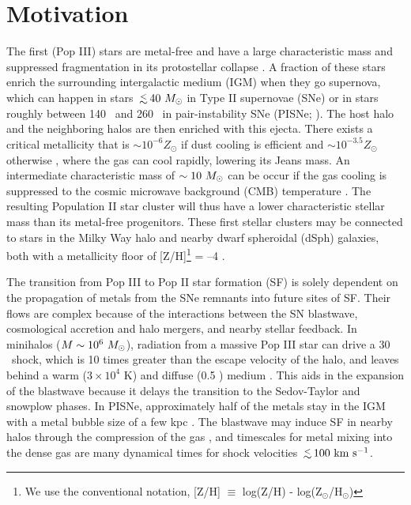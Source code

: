 \documentclass[12pt]{article}
\newcommand{\cubecm}{\ifmmode{{\rm cm^{-3}}}\else{cm$^{-3}$}\fi}
\newcommand{\lsim}{\lower0.3em\hbox{$\,\buildrel <\over\sim\,$}}
\newcommand{\kms}{\ifmmode{{\rm km~s^{-1}}}\else{km s$^{-1}$}\fi}
\newcommand{\Ms}{\ifmmode{M_\odot}\else{$M_\odot$}\fi}
\begin{document}
\section*{Motivation}

The first (Pop III) stars are metal-free and have a large
characteristic mass and suppressed fragmentation in its protostellar
collapse \cite{ABN02, Bromm02_P3, Yoshida03, OShea07a}.  A fraction of
these stars enrich the surrounding intergalactic medium (IGM) when
they go supernova, which can happen in stars $\lsim 40~\Ms$ in Type II
supernovae (SNe) or in stars roughly between 140 \Ms~and 260 \Ms~in
pair-instability SNe (PISNe; \cite{2002ApJ...567..532H}).  The host
halo and the neighboring halos are then enriched with this ejecta.
There exists a critical metallicity that is $\sim 10^{-6} Z_\odot$ if
dust cooling is efficient \cite{Omukai05, Schneider06_Frag, clark08}
and $\sim 10^{-3.5} Z_\odot$ otherwise \cite{Bromm01,
  2009ApJ...691..441S}, where the gas can cool rapidly, lowering its
Jeans mass.  An intermediate characteristic mass of $\sim10~\Ms$ can
be occur if the gas cooling is suppressed to the cosmic microwave
background (CMB) temperature \cite{Larson98, Tumlinson07_IMF,
  2009ApJ...691..441S}.  The resulting Population II star cluster will
thus have a lower characteristic stellar mass than its metal-free
progenitors.  These first stellar clusters may be connected to stars
in the Milky Way halo and nearby dwarf spheroidal (dSph) galaxies,
both with a metallicity floor of [Z/H]\footnote{We use the
  conventional notation, [Z/H] $\equiv$ log(Z/H) -
  log(Z$_\odot$/H$_\odot$)} = --4 \cite{Beers05, Tafelmeyer10,
  Frebel10_Obs}.

The transition from Pop III to Pop II star formation (SF) is solely
dependent on the propagation of metals from the SNe remnants into
future sites of SF.  Their flows are complex because of the
interactions between the SN blastwave, cosmological accretion and halo
mergers, and nearby stellar feedback.  In minihalos ($M \sim
10^6~\Ms$), radiation from a massive Pop III star can drive a 30
\kms~shock, which is 10 times greater than the escape velocity of the
halo, and leaves behind a warm ($3 \times 10^4$ K) and diffuse (0.5
\cubecm) medium \cite{Kitayama04, Whalen04, Abel07}.  This aids in the
expansion of the blastwave because it delays the transition to the
Sedov-Taylor and snowplow phases.  In PISNe, approximately half of the
metals stay in the IGM with a metal bubble size of a few kpc
\cite{Wise08_Gal, Greif10}.  The blastwave may induce SF in nearby
halos through the compression of the gas \cite{Ferrara98}, and
timescales for metal mixing into the dense gas are many dynamical
times \cite{Cen08} for shock velocities $\lsim100~\kms$.
\end{document}
